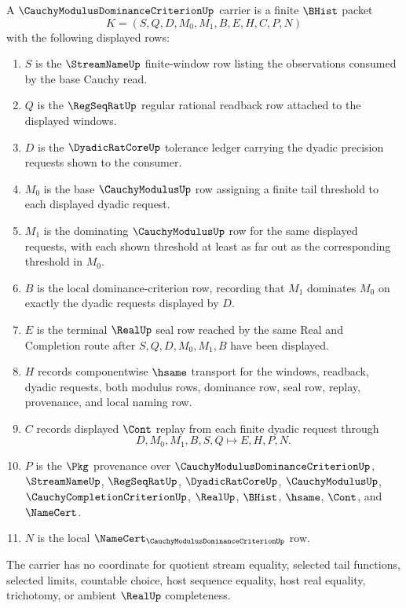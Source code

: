 \begin{definition}
\label{def:cauchy-modulus-dominance-criterion-carrier}
A $\CauchyModulusDominanceCriterionUp$ carrier is a finite $\BHist$ packet
$$
K=(S,Q,D,M_0,M_1,B,E,H,C,P,N)
$$
with the following displayed rows:
\begin{enumerate}
\item $S$ is the $\StreamNameUp$ finite-window row listing the observations consumed by the base Cauchy read.
\item $Q$ is the $\RegSeqRatUp$ regular rational readback row attached to the displayed windows.
\item $D$ is the $\DyadicRatCoreUp$ tolerance ledger carrying the dyadic precision requests shown to the consumer.
\item $M_0$ is the base $\CauchyModulusUp$ row assigning a finite tail threshold to each displayed dyadic request.
\item $M_1$ is the dominating $\CauchyModulusUp$ row for the same displayed requests, with each shown threshold at least as far out as the corresponding threshold in $M_0$.
\item $B$ is the local dominance-criterion row, recording that $M_1$ dominates $M_0$ on exactly the dyadic requests displayed by $D$.
\item $E$ is the terminal $\RealUp$ seal row reached by the same Real and Completion route after $S,Q,D,M_0,M_1,B$ have been displayed.
\item $H$ records componentwise $\hsame$ transport for the windows, readback, dyadic requests, both modulus rows, dominance row, seal row, replay, provenance, and local naming row.
\item $C$ records displayed $\Cont$ replay from each finite dyadic request through
$$
D,M_0,M_1,B,S,Q \longmapsto E,H,P,N .
$$
\item $P$ is the $\Pkg$ provenance over $\CauchyModulusDominanceCriterionUp$, $\StreamNameUp$, $\RegSeqRatUp$, $\DyadicRatCoreUp$, $\CauchyModulusUp$, $\CauchyCompletionCriterionUp$, $\RealUp$, $\BHist$, $\hsame$, $\Cont$, and $\NameCert$.
\item $N$ is the local $\NameCert_{\CauchyModulusDominanceCriterionUp}$ row.
\end{enumerate}
The carrier has no coordinate for quotient stream equality, selected tail functions, selected limits, countable choice, host sequence equality, host real equality, trichotomy, or ambient $\RealUp$ completeness.
\end{definition}

